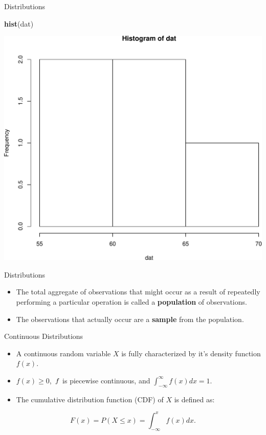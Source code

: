 \documentclass[9pt,ignorenonframetext,]{beamer}
\newenvironment{Shaded}{\begin{snugshade}}{\end{snugshade}}
\newcommand{\KeywordTok}[1]{\textcolor[rgb]{0.13,0.29,0.53}{\textbf{{#1}}}}
\newcommand{\NormalTok}[1]{{#1}}
\providecommand{\tightlist}{%
\setlength{\itemsep}{0pt}\setlength{\parskip}{0pt}}
\begin{document}
\begin{frame}[fragile]{Distributions}

\begin{Shaded}
\begin{Highlighting}[]
\KeywordTok{hist}\NormalTok{(dat)}
\end{Highlighting}
\end{Shaded}

\includegraphics{class2-jan11_files/figure-beamer/unnamed-chunk-3-1.pdf}

\end{frame}

\begin{frame}{Distributions}

\begin{itemize}
\tightlist
\item
  The total aggregate of observations that might occur as a result of
  repeatedly performing a particular operation is called a
  \textbf{population} of observations.
\item
  The observations that actually occur are a \textbf{sample} from the
  population.
\end{itemize}

\end{frame}

\begin{frame}{Continuous Distributions}

\begin{itemize}
\item
  A continuous random variable \(X\) is fully characterized by it's
  density function \(f(x)\).
\item
  \(f(x) \ge 0\), \(\thinspace f\) is piecewise continuous, and
  \(\int_{-\infty}^{\infty}f(x)dx=1\).
\item
  The cumulative distribution function (CDF) of \(X\) is defined as:
\end{itemize}

\[ F(x)=P(X \le x)=\int_{-\infty}^{x}f(x)dx.\]

\end{frame}
\end{document}

